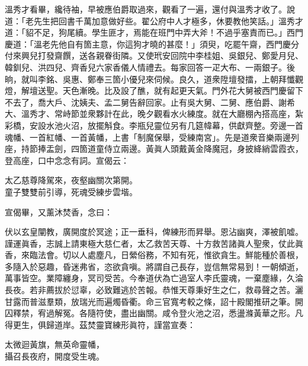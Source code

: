 溫秀才看畢，纔待袖，早被應伯爵取過來，觀看了一遍，還付與溫秀才收了。說道：「老先生把回書千萬加意做好些。翟公府中人才極多，休要教他笑話。」溫秀才道：「貂不足，狗尾續。學生匪才，焉能在班門中弄大斧！不過乎塞責而已。」西門慶道：「溫老先他自有箇主意，你這狗才曉的甚麼！」須臾，吃罷午齋，西門慶分付來興兒打發齋饌，送各親眷街隣。又使玳安回院中李桂姐、吳銀兒、鄭愛月兒、韓釧兒、洪四兒、齊香兒六家香儀人情禮去。每家回答一疋大布、一兩銀子。後晌，就叫李銘、吳惠、鄭奉三箇小優兒來伺候。良久，道衆陞壇發擂，上朝拜懺觀燈，解壇送聖。天色漸晚。比及設了醮，就有起更天氣。門外花大舅被西門慶留下不去了，喬大戶、沈姨夫、孟二舅告辭回家。止有吳大舅、二舅、應伯爵、謝希大、溫秀才、常峙節並衆夥計在此，晚夕觀看水火練度。就在大廳棚內搭高座，紮彩橋，安設水池火沼，放擺斛食。李瓶兒靈位另有几筵幃幕，供獻齊整。旁邊一首魂幡、一首紅幡、一首黃幡，上書「制魔保舉，受練南宮」。先是道衆音樂兩邊列座，持節捧盂劍，四箇道童侍立兩邊。黃眞人頭戴黃金降魔冠，身披絳綃雲霞衣，登高座，口中念念有詞。宣偈云：

\begin{myquote} 
太乙慈尊降駕來，夜壑幽關次第開。\\童子雙雙前引導，死魂受練步雲堦。
\end{myquote} 

宣偈畢，又薰沐焚香，念曰：

\begin{myquote}[\markfont]
伏以玄皇闡教，廣開度於冥途；正一垂科，俾練形而昇舉。恩沾幽爽，澤被飢嘘。謹運眞香，志誠上請東極大慈仁者，太乙救苦天尊、十方救苦諸眞人聖衆，仗此眞香，來臨法會。切以人處塵凡，日縈俗務，不知有死，惟欲貪生。鮮能種於善根，多隨入於惡趣，昏迷弗省，恣欲貪嗔。將謂自己長存，豈信無常易到！一朝傾逝，萬事皆空。業障纏身，冥司受苦。今奉道伏為亡過室人李氏靈魂，一棄塵緣，久淪長夜。若非薦拔於愆辜，必致難逃於苦報。恭惟天尊秉好生之仁，救尋聲之苦。灑甘露而普滋羣類，放瑞光而遍燭昏衢。命三官寬考較之條，詔十殿閣推研之筆。開囚釋禁，宥過解冤。各隨符使，盡出幽關。咸令登火池之沼，悉盪滌黃華之形。凡得更生，俱歸道岸。茲焚靈寶練形眞符，謹當宣奏：

太微迴黃旗，無英命靈幡，\\攝召長夜府，開度受生魂。

\end{myquote} 

